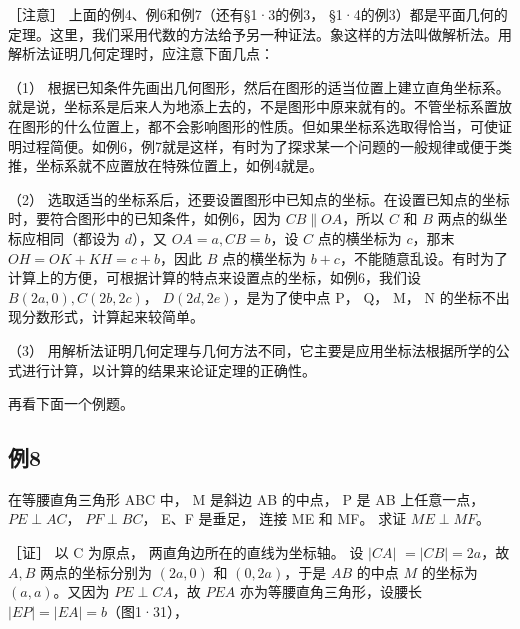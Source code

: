 ［注意］ 上面的例4、例6和例7（还有§1·3的例3，
§1·4的例3）都是平面几何的定理。这里，我们采用代数的方法给予另一种证法。象这样的方法叫做解析法。用解析法证明几何定理时，应注意下面几点：

（1）
根据已知条件先画出几何图形，然后在图形的适当位置上建立直角坐标系。就是说，坐标系是后来人为地添上去的，不是图形中原来就有的。不管坐标系置放在图形的什么位置上，都不会影响图形的性质。但如果坐标系选取得恰当，可使证明过程简便。如例6，例7就是这样，有时为了探求某一个问题的一般规律或便于类推，坐标系就不应置放在特殊位置上，如例4就是。

（2）
选取适当的坐标系后，还要设置图形中已知点的坐标。在设置已知点的坐标时，要符合图形中的已知条件，如例6，因为
\(CB \parallel OA\)，所以 \(C\) 和 \(B\) 两点的纵坐标应相同（都设为
\(d\)），又 \(OA = a, CB = b\)，设 \(C\) 点的横坐标为 \(c\)，那末
\(OH = OK + KH = c + b\)，因此 \(B\) 点的横坐标为
\(b + c\)，不能随意乱设。有时为了计算上的方便，可根据计算的特点来设置点的坐标，如例6，我们设
\(B(2a, 0), C(2b, 2c)\)， \(D(2d, 2e)\)，是为了使中点 P， Q， M， N
的坐标不出现分数形式，计算起来较简单。

（3）
用解析法证明几何定理与几何方法不同，它主要是应用坐标法根据所学的公式进行计算，以计算的结果来论证定理的正确性。

再看下面一个例题。

\subsection{例8}\label{ux4f8b8}

在等腰直角三角形 ABC 中， M 是斜边 AB 的中点， P 是 AB 上任意一点，
\(PE \perp AC\)， \(PF \perp BC\)， E、F 是垂足， 连接 ME 和 MF。 求证
\(ME \perp MF\)。

［证］ 以 C 为原点， 两直角边所在的直线为坐标轴。 设 \(\left|CA\right|\)
\(= |CB| = 2a\)，故 \(A, B\) 两点的坐标分别为 \((2a, 0)\) 和
\((0, 2a)\)，于是 \(AB\) 的中点 \(M\) 的坐标为 \((a, a)\)。又因为
\(PE \perp CA\)，故 \(PEA\) 亦为等腰直角三角形，设腰长
\(|EP| = |EA| = b\)（图1·31），


